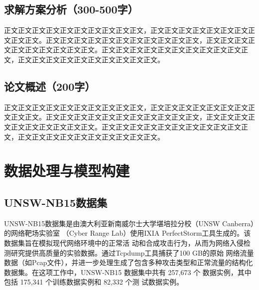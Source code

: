 \documentclass{article}
\begin{document}
\subsection{求解方案分析（300-500字）}
正文正文正文正文正文正文正文正文正文正文，正文正文正文正文正文正文正文正文正文正文。正文正文正文正文正文正文正文正文正文正文正文，正文正文正文正文正文正文正文正文正文正文。正文正文正文正文正文正文正文正文正文正文正文，正文正文正文正文正文正文正文正文正文正文。

\subsection{论文概述（200字）}
正文正文正文正文正文正文正文正文正文正文，正文正文正文正文正文正文正文正文正文正文。正文正文正文正文正文正文正文正文正文正文正文，正文正文正文正文正文正文正文正文正文正文。正文正文正文正文正文正文正文正文正文正文正文，正文正文正文正文正文正文正文正文正文正文。



\section{数据处理与模型构建}
\subsection{UNSW-NB15数据集}
UNSW-NB15数据集是由澳大利亚新南威尔士大学堪培拉分校（UNSW Canberra）的网络靶场实验室
（Cyber Range Lab）使用IXIA PerfectStorm工具生成的。该数据集旨在模拟现代网络环境中的正常活
动和合成攻击行为，从而为网络入侵检测研究提供高质量的实验数据。通过Tcpdump工具捕获了100 GB的原始
网络流量数据（如Pcap文件），并进一步处理生成了包含多种攻击类型和正常流量的结构化数据集。在这项工作中，UNSW-NB15 
数据集中共有 257,673 个
数据实例，其中包括 175,341 个训练数据实例和 82,332 个测
试数据实例。
\end{document}
